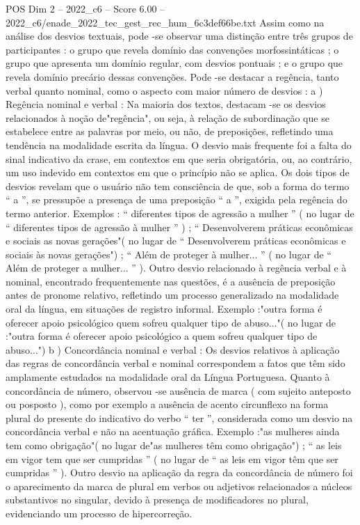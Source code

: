 \begin{textsample}{POS Dim 2 – 2022\_c6 – Score 6.00 – 2022\_c6/enade\_2022\_tec\_gest\_rec\_hum\_6c3def66be.txt}
Assim como na análise dos desvios textuais, pode -se observar uma distinção entre três grupos de participantes : o grupo que revela domínio das convenções morfossintáticas ; o grupo que apresenta um domínio regular, com desvios pontuais ; e o grupo que revela domínio precário dessas convenções.
Pode -se destacar a regência, tanto verbal quanto nominal, como o aspecto com maior número de desvios : a ) Regência nominal e verbal : Na maioria dos textos, destacam -se os desvios relacionados à noção de"regência", ou seja, à relação de subordinação que se estabelece entre as palavras por meio, ou não, de preposições, refletindo uma tendência na modalidade escrita da língua.
O desvio mais frequente foi a falta do sinal indicativo da crase, em contextos em que seria obrigatória, ou, ao contrário, um uso indevido em contextos em que o princípio não se aplica.
Os dois tipos de desvios revelam que o usuário não tem consciência de que, sob a forma do termo “ a ”, se pressupõe a presença de uma preposição “ a ”, exigida pela regência do termo anterior.
Exemplos : “ diferentes tipos de agressão a mulher ” ( no lugar de “ diferentes tipos de agressão à mulher ” ) ; “ Desenvolverem práticas econômicas e sociais as novas gerações"( no lugar de “ Desenvolverem práticas econômicas e sociais às novas gerações") ; “ Além de proteger à mulher... ” ( no lugar de “ Além de proteger a mulher... ” ).
Outro desvio relacionado à regência verbal e à nominal, encontrado frequentemente nas questões, é a ausência de preposição antes de pronome relativo, refletindo um processo generalizado na modalidade oral da língua, em situações de registro informal.
Exemplo :"outra forma é oferecer apoio psicológico quem sofreu qualquer tipo de abuso..."( no lugar de :"outra forma é oferecer apoio psicológico a quem sofreu qualquer tipo de abuso...") b ) Concordância nominal e verbal : Os desvios relativos à aplicação das regras de concordância verbal e nominal correspondem a fatos que têm sido amplamente estudados na modalidade oral da Língua Portuguesa.
Quanto à concordância de número, observou -se ausência de marca ( com sujeito anteposto ou posposto ), como por exemplo a ausência de acento circunflexo na forma plural do presente do indicativo do verbo “ ter ”, considerada como um desvio na concordância verbal e não na acentuação gráfica.
Exemplo :"as mulheres ainda tem como obrigação"( no lugar de"as mulheres têm como obrigação") ; “ as leis em vigor tem que ser cumpridas ” ( no lugar de “ as leis em vigor têm que ser cumpridas ” ).
Outro desvio na aplicação da regra da concordância de número foi o aparecimento da marca de plural em verbos ou adjetivos relacionados a núcleos substantivos no singular, devido à presença de modificadores no plural, evidenciando um processo de hipercorreção.

\end{textsample}
